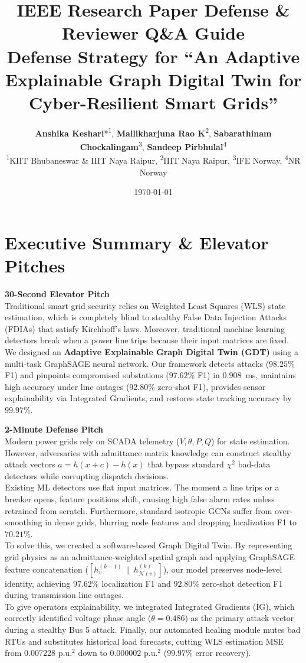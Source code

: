 \documentclass[11pt,a4paper]{article}
\title{\textbf{IEEE Research Paper Defense \& Reviewer Q\&A Guide}\\ \large Defense Strategy for ``An Adaptive Explainable Graph Digital Twin for Cyber-Resilient Smart Grids''}
\author{\textbf{Anshika Keshari}*\textsuperscript{1}, \textbf{Mallikharjuna Rao K}\textsuperscript{2}, \textbf{Sabarathinam Chockalingam}\textsuperscript{3}, \textbf{Sandeep Pirbhulal}\textsuperscript{4} \\
\small \textsuperscript{1}KIIT Bhubaneswar \& IIIT Naya Raipur, \textsuperscript{2}IIIT Naya Raipur, \textsuperscript{3}IFE Norway, \textsuperscript{4}NR Norway}
\date{\today}
\begin{document}
\maketitle

\tableofcontents
\newpage

\section{Executive Summary \& Elevator Pitches}

\begin{mdframed}[style=pitchstyle]
\textbf{30-Second Elevator Pitch}\\
Traditional smart grid security relies on Weighted Least Squares (WLS) state estimation, which is completely blind to stealthy False Data Injection Attacks (FDIAs) that satisfy Kirchhoff's laws. Moreover, traditional machine learning detectors break when a power line trips because their input matrices are fixed. We designed an \textbf{Adaptive Explainable Graph Digital Twin (GDT)} using a multi-task GraphSAGE neural network. Our framework detects attacks ($98.25\%$ F1) and pinpoints compromised substations ($97.62\%$ F1) in $0.908$~ms, maintains high accuracy under line outages ($92.80\%$ zero-shot F1), provides sensor explainability via Integrated Gradients, and restores state tracking accuracy by $99.97\%$.
\end{mdframed}

\begin{mdframed}[style=pitchstyle]
\textbf{2-Minute Defense Pitch}\\
Modern power grids rely on SCADA telemetry ($V, \theta, P, Q$) for state estimation. However, adversaries with admittance matrix knowledge can construct stealthy attack vectors $a = h(x+c) - h(x)$ that bypass standard $\chi^2$ bad-data detectors while corrupting dispatch decisions.\\

Existing ML detectors use flat input matrices. The moment a line trips or a breaker opens, feature positions shift, causing high false alarm rates unless retrained from scratch. Furthermore, standard isotropic GCNs suffer from over-smoothing in dense grids, blurring node features and dropping localization F1 to $70.21\%$.\\

To solve this, we created a software-based Graph Digital Twin. By representing grid physics as an admittance-weighted spatial graph and applying GraphSAGE feature concatenation ($[h_v^{(k-1)} \,\|\, h_{\mathcal{N}(v)}^{(k)}]$), our model preserves node-level identity, achieving $97.62\%$ localization F1 and $92.80\%$ zero-shot detection F1 during transmission line outages.\\

To give operators explainability, we integrated Integrated Gradients (IG), which correctly identified voltage phase angle ($\theta = 0.486$) as the primary attack vector during a stealthy Bus 5 attack. Finally, our automated healing module mutes bad RTUs and substitutes historical load forecasts, cutting WLS estimation MSE from $0.007228\text{ p.u.}^2$ down to $0.000002\text{ p.u.}^2$ ($99.97\%$ error recovery).
\end{mdframed}
\end{document}
